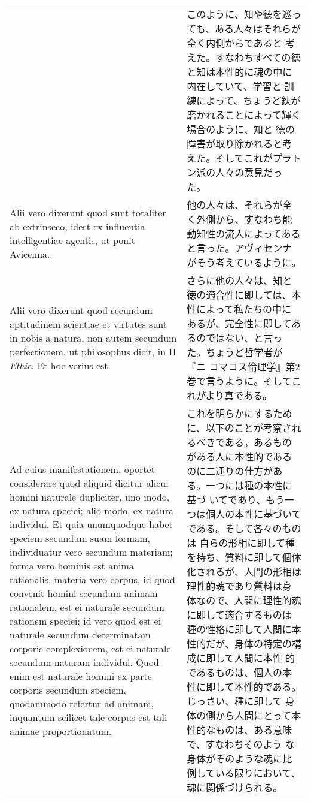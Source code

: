\documentclass[10pt]{jsarticle}
\begin{document}
\begin{longtable}{p{21em}p{21em}}
&

 このように、知や徳を巡っても、ある人々はそれらが全く内側からであると
 考えた。すなわちすべての徳と知は本性的に魂の中に内在していて、学習と
 訓練によって、ちょうど鉄が磨かれることによって輝く場合のように、知と
 徳の障害が取り除かれると考えた。そしてこれがプラトン派の人々の意見だっ
 た。

 
 
\\


 Alii vero dixerunt quod sunt totaliter ab extrinseco, idest ex
 influentia intelligentiae agentis, ut ponit Avicenna.


&

 他の人々は、それらが全く外側から、すなわち能動知性の流入によってある
 と言った。アヴィセンナがそう考えているように。

 
\\


 Alii vero dixerunt quod secundum aptitudinem scientiae et virtutes
 sunt in nobis a natura, non autem secundum perfectionem, ut
 philosophus dicit, in II {\itshape Ethic}. Et hoc verius est.


&

 さらに他の人々は、知と徳の適合性に即しては、本性によって私たちの中に
 あるが、完全性に即してあるのではない、と言った。ちょうど哲学者が『ニ
 コマコス倫理学』第2巻で言うように。そしてこれがより真である。

 
\\


 Ad cuius manifestationem, oportet considerare quod aliquid dicitur
 alicui homini naturale dupliciter, uno modo, ex natura speciei; alio
 modo, ex natura individui. Et quia unumquodque habet speciem secundum
 suam formam, individuatur vero secundum materiam; forma vero hominis
 est anima rationalis, materia vero corpus, id quod convenit homini
 secundum animam rationalem, est ei naturale secundum rationem
 speciei; id vero quod est ei naturale secundum determinatam corporis
 complexionem, est ei naturale secundum naturam individui. Quod enim
 est naturale homini ex parte corporis secundum speciem, quodammodo
 refertur ad animam, inquantum scilicet tale corpus est tali animae
 proportionatum.


&

 これを明らかにするために、以下のことが考察されるべきである。あるもの
 がある人に本性的であるのに二通りの仕方がある。一つには種の本性に基づ
 いてであり、もう一つは個人の本性に基づいてである。そして各々のものは
 自らの形相に即して種を持ち、質料に即して個体化されるが、人間の形相は
 理性的魂であり質料は身体なので、人間に理性的魂に即して適合するものは
 種の性格に即して人間に本性的だが、身体の特定の構成に即して人間に本性
 的であるものは、個人の本性に即して本性的である。じっさい、種に即して
 身体の側から人間にとって本性的なものは、ある意味で、すなわちそのよう
 な身体がそのような魂に比例している限りにおいて、魂に関係づけられる。
 

\end{longtable}
\end{document}
